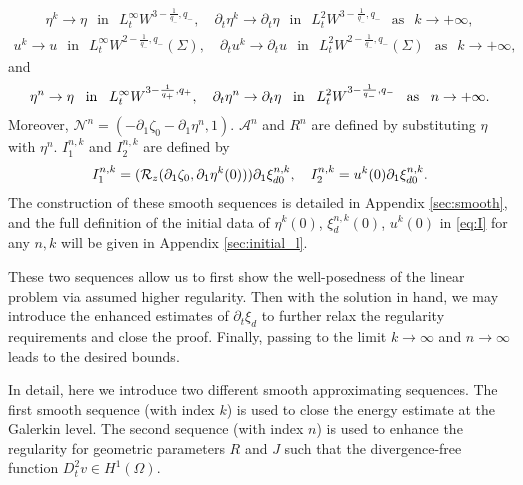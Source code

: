 \documentclass[letterpaper,reqno,10pt,twoside]{amsart}
\theoremstyle{definition}
\theoremstyle{remark}
\def\dt{\partial_t}
\def\p{\partial}
\def\rt{\rightarrow}
\begin{document}
	\begin{align}\label{temp 2}
		\eta^{k}\rightarrow \eta ~~\operatorname{in}~~L_{t}^{\infty}W^{3-\frac{1}{q_{-}},q_{-}}, \quad
		\partial_{t}\eta^{k}\rightarrow \partial_{t}\eta ~~\operatorname{in}~~L_{t}^{2}W^{3-\frac{1}{q_{-}},q_{-}}~~\operatorname{as}~~k\rightarrow+\infty,
	\end{align}
	\begin{align}\label{temp 3}
		u^{k}\rightarrow u~~\operatorname{in}~~L_{t}^{\infty}W^{2-\frac{1}{q_{-}},q_{-}}(\Sigma),\quad 
		\partial_{t}u^{k}\rightarrow \partial_{t}u~~\operatorname{in}~~L_{t}^{2}W^{2-\frac{1}{q_{-}},q_{-}}(\Sigma)~~\operatorname{as}~~k\rightarrow+\infty,
	\end{align}
	\noindent and
	\begin{align}{\label{convergence_n}}
		\eta^{n}\rightarrow \eta ~~\operatorname{in}~~L_{t}^{\infty}W^{3-\frac{1}{q_{+}},q_{+}}, \quad
		\partial_{t}\eta^{n}\rightarrow \partial_{t}\eta ~~\operatorname{in}~~L_{t}^{2}W^{3-\frac{1}{q_{-}},q_{-}}~~\operatorname{as}~~n\rightarrow+\infty.
	\end{align}
	\noindent Moreover, $\mathcal{N}^{n}=(-\p_{1}\zeta_{0}-\p_{1}\eta^{n},1)$. $\mathcal{A}^{n}$ and $R^{n}$ are defined by substituting $\eta$ with $\eta^{n}$. $I_{1}^{n,k}$ and $I_{2}^{n,k}$ are defined by
	\begin{align}{\label{eq:I}}
		\begin{aligned}
			I_{1}^{n,k}=(\mathcal{R}_{z}(\p_{1}\zeta_{0},\p_{1}\eta^{k}(0)))\p_{1}\xi_{d0}^{n,k},\quad
			I_{2}^{n,k}=u^{k}(0)\p_{1}\xi_{d0}^{n,k}.
		\end{aligned}
	\end{align}
	The construction of these smooth sequences is detailed in Appendix \ref{sec:smooth}, and the full definition of the initial data of $\eta^{k}(0)$, $\xi_{d}^{n,k}(0)$, $u^{k}(0)$ in \eqref{eq:I} for any $n, k$ will be given in Appendix \ref{sec:initial_l}.
	
	These two sequences allow us to first show the well-posedness of the linear problem via assumed higher regularity. Then with the solution in hand, we may introduce the enhanced estimates of $\dt\xi_d$ to further relax the regularity requirements  and close the proof. Finally, passing to the limit $k\rt\infty$ and $n\rt\infty$ leads to the desired bounds.
	
	In detail, here we introduce two different smooth approximating sequences. The first smooth sequence (with index $k$) is used to close the energy estimate at the Galerkin level. The second sequence (with index $n$) is used to enhance the regularity for geometric parameters $R$ and $J$ such that the divergence-free function $D_{t}^{2}v\in H^{1}(\Omega)$.
	
\end{document}
